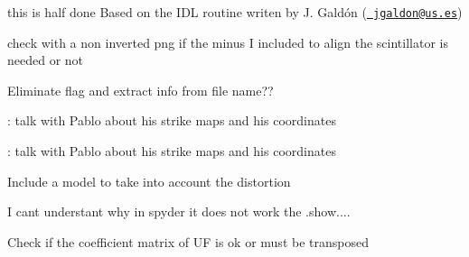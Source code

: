 
\begin{DoxyRefList}
\item[Member \mbox{\hyperlink{namespaceLibFILDSIM_ab0c03082ef6b49d3a3f166a877041815}{Lib\+FILDSIM.calculate\+\_\+absolute\+\_\+flux}} (raw\+\_\+frame, calibration\+\_\+frame, efficiency\+\_\+energy, efficiency\+\_\+yield, b\+\_\+field, band\+\_\+pass\+\_\+filter, interpolated\+\_\+gyro, interpolated\+\_\+fcol, roi, pinhole\+\_\+area, exposure\+\_\+time, A, Z, calib\+\_\+exposure\+\_\+time, pixel\+\_\+area\+\_\+covered, int\+\_\+photon\+\_\+flux, method, ignore\+\_\+fcol=False, lower\+\_\+limit=0.\+05)]\label{todo__todo000001}%
%
this is half done Based on the IDL routine writen by J. Galdón (\href{mailto:jgaldon@us.es}{\texttt{ jgaldon@us.\+es}}) 
\item[Member \mbox{\hyperlink{namespaceLibMap_abeb9b36f78beec2f76470080bde20e4d}{Lib\+Map.calculate\+\_\+transformation\+\_\+factors}} (scintillator, fig, bool plt\+\_\+flag=True)]\label{todo__todo000003}%
%
check with a non inverted png if the minus I included to align the scintillator is needed or not 
\item[Member \mbox{\hyperlink{classLibMap_1_1StrikeMap_a1ac2f02fa2eb376dbfdc46258267fbfb}{Lib\+Map.Strike\+Map.\+\_\+\+\_\+init\+\_\+\+\_\+}} (self, flag, file)]\label{todo__todo000004}%
%
Eliminate flag and extract info from file name?? 
\item[Member \mbox{\hyperlink{classLibMap_1_1StrikeMap_a02708e716a4c42d9451cfad0bde2accc}{Lib\+Map.Strike\+Map.pitch}} ]\label{todo__todo000005}%
%
\+: talk with Pablo about his strike maps and his coordinates 

\label{todo__todo000006}%
%
\+: talk with Pablo about his strike maps and his coordinates  
\item[Member \mbox{\hyperlink{namespaceLibMap_ac38fcf0ae779d053833f37492ef245c8}{Lib\+Map.transform\+\_\+to\+\_\+pixel}} (x, y, grid\+\_\+param)]\label{todo__todo000002}%
%
Include a model to take into account the distortion 
\item[Member \mbox{\hyperlink{namespaceLibTimeTraces_a53666d42fe4a521c4386d33de043e8bd}{Lib\+Time\+Traces.create\+\_\+roi}} (fig, re\+\_\+display=False)]\label{todo__todo000007}%
%
I can\textquotesingle{}t understant why in spyder it does not work the .show.... 
\item[Member \mbox{\hyperlink{namespaceLibVideoFiles_a2d425d35b0bed831afe1c9f7d5cef2fc}{Lib\+Video\+Files.read\+\_\+settings}} (str filename, int bit\+\_\+pos, bool verbose=False)]\label{todo__todo000008}%
%
Check if the coefficient matrix of UF is ok or must be transposed
\end{DoxyRefList}